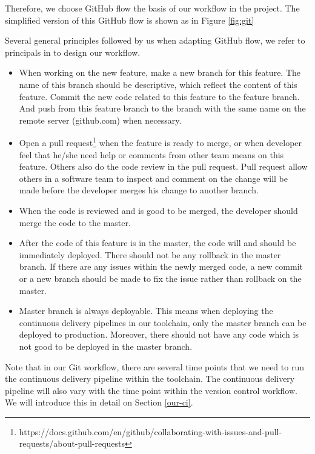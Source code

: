 Therefore, we choose GitHub flow \cite{chacongithub} the basis of our workflow in the project. The simplified version of this GitHub flow is shown as in Figure \ref{fig:git} 
\par
Several general principles followed by us when adapting GitHub flow, we refer to principals in \cite{chacongithub} to design our workflow.
\begin{itemize}
\item When working on the new feature, make a new branch for this feature. The name of this branch should be descriptive, which reflect the content of this feature. Commit the new code related to this feature to the feature branch. And push from this feature branch to the branch with the same name on the remote server (github.com) when necessary.
\item Open a pull request\footnote{https://docs.github.com/en/github/collaborating-with-issues-and-pull-requests/about-pull-requests} when the feature is ready to merge, or when developer feel that he/she need help or comments from other team means on this feature. Others also do the code review in the pull request. Pull request allow others in a software team to inspect and comment on the change will be made before the developer merges his change to another branch.
\item When the code is reviewed and is good to be merged, the developer should merge the code to the master.
\item After the code of this feature is in the master, the code will and should be immediately deployed. There should not be any rollback in the master branch. If there are any issues within the newly merged code, a new commit or a new branch should be made to fix the issue rather than rollback on the master.
\item Master branch is always deployable. This means when deploying the continuous delivery pipelines in our toolchain, only the master branch can be deployed to production. Moreover, there should not have any code which is not good to be deployed in the master branch.
\end{itemize}
\par
Note that in our Git workflow, there are several time points that we need to run the continuous delivery pipeline within the toolchain. The continuous delivery pipeline will also vary with the time point within the version control workflow. We will introduce this in detail on Section \ref{our-ci}.
